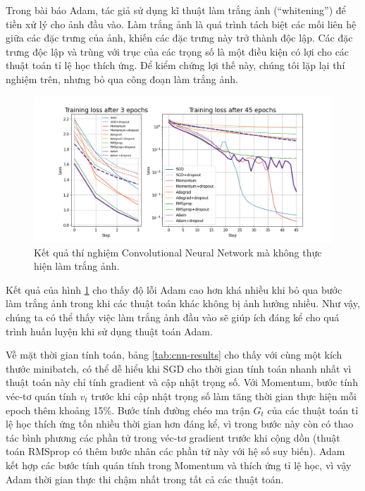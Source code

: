 Trong bài báo Adam, tác giả sử dụng kĩ thuật làm trắng ảnh (``whitening'') để tiền xử lý cho ảnh đầu vào. Làm trắng ảnh là quá trình tách biệt các mối liên hệ giữa các đặc trưng của ảnh, khiến các đặc trưng này trở thành độc lập\cite{kessey2015optimal}. Các đặc trưng độc lập và trùng với trục của các trọng số là một điều kiện có lợi cho các thuật toán tỉ lệ học thích ứng. Để kiểm chứng lợi thế này, chúng tôi lặp lại thí nghiệm trên, nhưng bỏ qua công đoạn làm trắng ảnh.

\begin{figure}[H]
	\centering
	\includegraphics[width=140 mm]{images/cnn-nonwhitened.png}
	\caption{Kết quả thí nghiệm Convolutional Neural Network mà không thực hiện làm trắng ảnh.}
	\label{fig:exp-cnn-nonw}
\end{figure}

Kết quả của hình \ref{fig:exp-cnn-nonw} cho thấy độ lỗi Adam cao hơn khá nhiều khi bỏ qua bước làm trắng ảnh trong khi các thuật toán khác không bị ảnh hưởng nhiều. Như vậy, chúng ta có thể thấy việc làm trắng ảnh đầu vào sẽ giúp ích đáng kể cho quá trình huấn luyện khi sử dụng thuật toán Adam.

Về mặt thời gian tính toán, bảng \ref{tab:cnn-results} cho thấy với cùng một kích thước minibatch, có thể dễ hiểu khi SGD cho thời gian tính toán nhanh nhất vì thuật toán này chỉ tính gradient và cập nhật trọng số. Với Momentum, bước tính véc-tơ quán tính $v_t$ trước khi cập nhật trọng số làm tăng thời gian thực hiện mỗi epoch thêm khoảng 15$\%$. Bước tính đường chéo ma trận $G_t$ của các thuật toán tỉ lệ học thích ứng tốn nhiều thời gian hơn đáng kể, vì trong bước này còn có thao tác bình phương các phần tử trong véc-tơ gradient trước khi cộng dồn (thuật toán RMSprop có thêm bước nhân các phần tử này với hệ số suy biến). Adam kết hợp các bước tính quán tính trong Momentum và thích ứng tỉ lệ học, vì vậy Adam thời gian thực thi chậm nhất trong tất cả các thuật toán.


